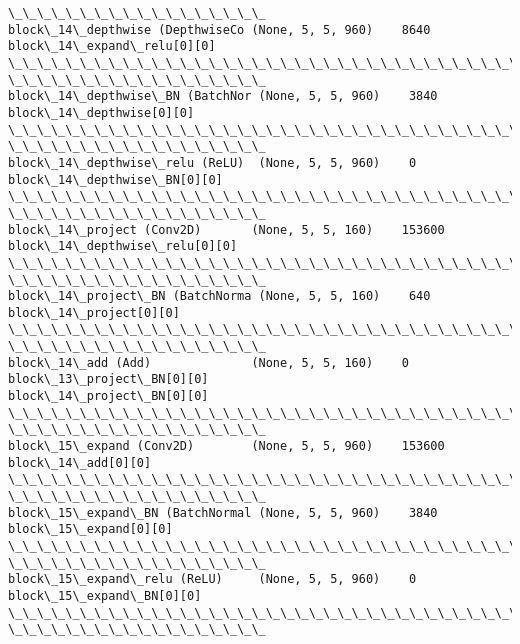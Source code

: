 \documentclass[11pt]{article}
\begin{document}
\begin{Verbatim}[commandchars=\\\{\}]
\_\_\_\_\_\_\_\_\_\_\_\_\_\_\_\_\_\_
block\_14\_depthwise (DepthwiseCo (None, 5, 5, 960)    8640
block\_14\_expand\_relu[0][0]
\_\_\_\_\_\_\_\_\_\_\_\_\_\_\_\_\_\_\_\_\_\_\_\_\_\_\_\_\_\_\_\_\_\_\_\_\_\_\_\_\_\_\_\_\_\_\_\_\_\_\_\_\_\_\_\_\_\_\_\_\_\_\_\_\_\_\_\_\_\_\_\_\_\_\_\_\_\_\_\_
\_\_\_\_\_\_\_\_\_\_\_\_\_\_\_\_\_\_
block\_14\_depthwise\_BN (BatchNor (None, 5, 5, 960)    3840
block\_14\_depthwise[0][0]
\_\_\_\_\_\_\_\_\_\_\_\_\_\_\_\_\_\_\_\_\_\_\_\_\_\_\_\_\_\_\_\_\_\_\_\_\_\_\_\_\_\_\_\_\_\_\_\_\_\_\_\_\_\_\_\_\_\_\_\_\_\_\_\_\_\_\_\_\_\_\_\_\_\_\_\_\_\_\_\_
\_\_\_\_\_\_\_\_\_\_\_\_\_\_\_\_\_\_
block\_14\_depthwise\_relu (ReLU)  (None, 5, 5, 960)    0
block\_14\_depthwise\_BN[0][0]
\_\_\_\_\_\_\_\_\_\_\_\_\_\_\_\_\_\_\_\_\_\_\_\_\_\_\_\_\_\_\_\_\_\_\_\_\_\_\_\_\_\_\_\_\_\_\_\_\_\_\_\_\_\_\_\_\_\_\_\_\_\_\_\_\_\_\_\_\_\_\_\_\_\_\_\_\_\_\_\_
\_\_\_\_\_\_\_\_\_\_\_\_\_\_\_\_\_\_
block\_14\_project (Conv2D)       (None, 5, 5, 160)    153600
block\_14\_depthwise\_relu[0][0]
\_\_\_\_\_\_\_\_\_\_\_\_\_\_\_\_\_\_\_\_\_\_\_\_\_\_\_\_\_\_\_\_\_\_\_\_\_\_\_\_\_\_\_\_\_\_\_\_\_\_\_\_\_\_\_\_\_\_\_\_\_\_\_\_\_\_\_\_\_\_\_\_\_\_\_\_\_\_\_\_
\_\_\_\_\_\_\_\_\_\_\_\_\_\_\_\_\_\_
block\_14\_project\_BN (BatchNorma (None, 5, 5, 160)    640
block\_14\_project[0][0]
\_\_\_\_\_\_\_\_\_\_\_\_\_\_\_\_\_\_\_\_\_\_\_\_\_\_\_\_\_\_\_\_\_\_\_\_\_\_\_\_\_\_\_\_\_\_\_\_\_\_\_\_\_\_\_\_\_\_\_\_\_\_\_\_\_\_\_\_\_\_\_\_\_\_\_\_\_\_\_\_
\_\_\_\_\_\_\_\_\_\_\_\_\_\_\_\_\_\_
block\_14\_add (Add)              (None, 5, 5, 160)    0
block\_13\_project\_BN[0][0]
block\_14\_project\_BN[0][0]
\_\_\_\_\_\_\_\_\_\_\_\_\_\_\_\_\_\_\_\_\_\_\_\_\_\_\_\_\_\_\_\_\_\_\_\_\_\_\_\_\_\_\_\_\_\_\_\_\_\_\_\_\_\_\_\_\_\_\_\_\_\_\_\_\_\_\_\_\_\_\_\_\_\_\_\_\_\_\_\_
\_\_\_\_\_\_\_\_\_\_\_\_\_\_\_\_\_\_
block\_15\_expand (Conv2D)        (None, 5, 5, 960)    153600
block\_14\_add[0][0]
\_\_\_\_\_\_\_\_\_\_\_\_\_\_\_\_\_\_\_\_\_\_\_\_\_\_\_\_\_\_\_\_\_\_\_\_\_\_\_\_\_\_\_\_\_\_\_\_\_\_\_\_\_\_\_\_\_\_\_\_\_\_\_\_\_\_\_\_\_\_\_\_\_\_\_\_\_\_\_\_
\_\_\_\_\_\_\_\_\_\_\_\_\_\_\_\_\_\_
block\_15\_expand\_BN (BatchNormal (None, 5, 5, 960)    3840
block\_15\_expand[0][0]
\_\_\_\_\_\_\_\_\_\_\_\_\_\_\_\_\_\_\_\_\_\_\_\_\_\_\_\_\_\_\_\_\_\_\_\_\_\_\_\_\_\_\_\_\_\_\_\_\_\_\_\_\_\_\_\_\_\_\_\_\_\_\_\_\_\_\_\_\_\_\_\_\_\_\_\_\_\_\_\_
\_\_\_\_\_\_\_\_\_\_\_\_\_\_\_\_\_\_
block\_15\_expand\_relu (ReLU)     (None, 5, 5, 960)    0
block\_15\_expand\_BN[0][0]
\_\_\_\_\_\_\_\_\_\_\_\_\_\_\_\_\_\_\_\_\_\_\_\_\_\_\_\_\_\_\_\_\_\_\_\_\_\_\_\_\_\_\_\_\_\_\_\_\_\_\_\_\_\_\_\_\_\_\_\_\_\_\_\_\_\_\_\_\_\_\_\_\_\_\_\_\_\_\_\_
\_\_\_\_\_\_\_\_\_\_\_\_\_\_\_\_\_\_

\end{Verbatim}
\end{document}
